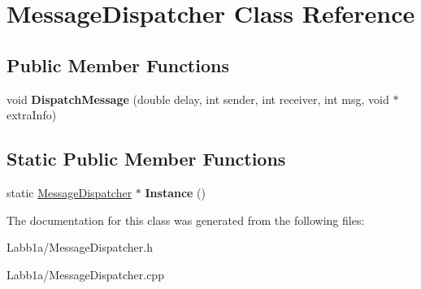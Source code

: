 \hypertarget{class_message_dispatcher}{}\section{Message\+Dispatcher Class Reference}
\label{class_message_dispatcher}
\subsection*{Public Member Functions}
\begin{DoxyCompactItemize}
\item 
\hypertarget{class_message_dispatcher_a0a206b3af513b20f33bbcfad28e977cb}{}void {\bfseries Dispatch\+Message} (double delay, int sender, int receiver, int msg, void $\ast$extra\+Info)\label{class_message_dispatcher_a0a206b3af513b20f33bbcfad28e977cb}

\end{DoxyCompactItemize}
\subsection*{Static Public Member Functions}
\begin{DoxyCompactItemize}
\item 
\hypertarget{class_message_dispatcher_a8b3571dd8cac14ac0c7695e9904b00c3}{}static \hyperlink{class_message_dispatcher}{Message\+Dispatcher} $\ast$ {\bfseries Instance} ()\label{class_message_dispatcher_a8b3571dd8cac14ac0c7695e9904b00c3}

\end{DoxyCompactItemize}


The documentation for this class was generated from the following files\+:\begin{DoxyCompactItemize}
\item 
Labb1a/Message\+Dispatcher.\+h\item 
Labb1a/Message\+Dispatcher.\+cpp\end{DoxyCompactItemize}
